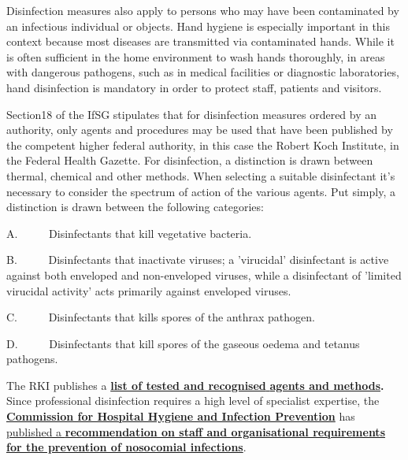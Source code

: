 \documentclass{article}
\begin{document}
Disinfection measures also apply to persons who may have been contaminated by an infectious individual or objects. Hand hygiene is especially important in this context because most diseases are transmitted via contaminated hands. While it is often sufficient in the home environment to wash hands thoroughly, in areas with dangerous pathogens, such as in medical facilities or diagnostic laboratories, hand disinfection is mandatory in order to protect staff, patients and visitors.


Section18 of the IfSG stipulates that for disinfection measures ordered by an authority, only agents and procedures may be used that have been published by the competent higher federal authority, in this case the Robert Koch Institute, in the Federal Health Gazette. For disinfection, a distinction is drawn between thermal, chemical and other methods. When selecting a suitable disinfectant it’s necessary to consider the spectrum of action of the various agents. Put simply, a distinction is drawn between the following categories:


A.      Disinfectants that kill vegetative bacteria.


B.      Disinfectants that inactivate viruses; a 'virucidal' disinfectant is active against both enveloped and non-enveloped viruses, while a disinfectant of 'limited virucidal activity' acts primarily against enveloped viruses.


C.      Disinfectants that kills spores of the anthrax pathogen.


D.      Disinfectants that kill spores of the gaseous oedema and tetanus pathogens.


The RKI publishes a \textbf{\href{https://www.rki.de/DE/Content/Infekt/Krankenhaushygiene/Desinfektionsmittel/Desinfektionsmittellist/Desinfektionsmittelliste_node.html}{list of tested and recognised}}\href{https://www.rki.de/DE/Content/Infekt/Krankenhaushygiene/Desinfektionsmittel/Desinfektionsmittellist/Desinfektionsmittelliste_node.html}{ }\textbf{\href{https://www.rki.de/DE/Content/Infekt/Krankenhaushygiene/Desinfektionsmittel/Desinfektionsmittellist/Desinfektionsmittelliste_node.html}{agents and methods}}\textbf{. }Since professional disinfection requires a high level of specialist expertise, the \textbf{\href{https://www.rki.de/DE/Content/Kommissionen/KRINKO/krinko_node.html}{Commission for Hospital Hygiene and Infection Prevention}}\textbf{ }has\textbf{ }\href{https://www.rki.de/DE/Content/Infekt/Krankenhaushygiene/Kommission/Downloads/Rili_Hygmanagement.pdf}{published a }\textbf{\href{https://www.rki.de/DE/Content/Infekt/Krankenhaushygiene/Kommission/Downloads/Rili_Hygmanagement.pdf}{recommendation on staff and organisational requirements}} \textbf{\href{https://www.rki.de/DE/Content/Infekt/Krankenhaushygiene/Kommission/Downloads/Rili_Hygmanagement.pdf}{for the prevention of nosocomial infections}}.
\end{document}
